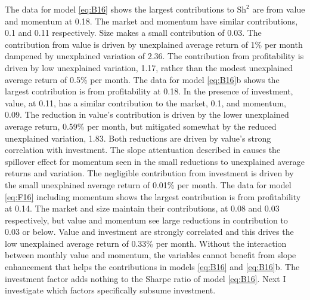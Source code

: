 The data for model \ref{eq:B16} shows the largest contributions to
$\text{Sh}^2$ are from value and momentum at 0.18.
The market and momentum have similar contributions, 0.1 and 0.11 respectively.
Size makes a small contribution of 0.03.
The contribution from value is driven by unexplained average return of 1\% per
month dampened by unexplained variation of 2.36.
The contribution from profitability is driven by low unexplained variation,
1.17, rather than the modest unexplained average return of 0.5\% per month.
The data for model \ref{eq:B16}b shows the largest contribution is
from profitability at 0.18.
In the presence of investment, value, at 0.11, has a similar contribution to
the market, 0.1, and momentum, 0.09.
The reduction in value's contribution is driven by the lower unexplained
average return, 0.59\% per month, but mitigated somewhat by the reduced
unexplained variation, 1.83.
Both reductions are driven by value's strong correlation with investment.
The slope attentuation described in \textcite{fama2015incremental} causes the
spillover effect for momentum seen in the small reductions to unexplained
average returns and variation.
The negligible contribution from investment is driven by the small unexplained
average return of 0.01\% per month.
The data for model \ref{eq:F16} including momentum shows the largest
contribution is from profitability at 0.14.
The market and size maintain their contributions, at 0.08 and 0.03
respectively, but value and momentum see large reductions in contribution to
0.03 or below.
Value and investment are strongly correlated and this drives the low
unexplained average return of 0.33\% per month.
Without the interaction between monthly value and momentum, the variables
cannot benefit from slope enhancement that helps the contributions in
models \ref{eq:B16} and \ref{eq:B16}b.
The investment factor adds nothing to the Sharpe ratio of model \ref{eq:B16}.
Next I investigate which factors specifically subsume investment.
